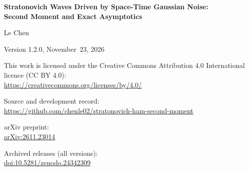 \begin{titlepage}
  \raggedright
  \vspace*{\fill}
  {\small
  \textbf{Stratonovich Waves Driven by Space-Time Gaussian Noise:\\
  Second Moment and Exact Asymptotics}\par
  \smallskip
  Le Chen\par
  \bigskip
  Version 1.2.0, November~23, 2026\par
  \bigskip
  This work is licensed under the Creative Commons Attribution 4.0
  International licence (CC BY 4.0):\\
  \url{https://creativecommons.org/licenses/by/4.0/}\par
  \bigskip
  Source and development record:\\
  \url{https://github.com/chenle02/stratonovich-ham-second-moment}\par
  \bigskip
  arXiv preprint:\\
  \href{https://arxiv.org/abs/2611.23014}{arXiv:2611.23014}\par
  \bigskip
  Archived releases (all versions):\\
  \href{https://doi.org/10.5281/zenodo.24342309}{doi:10.5281/zenodo.24342309}\par
  }
\end{titlepage}
